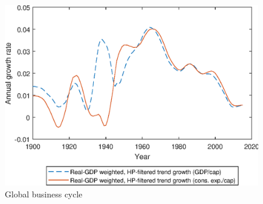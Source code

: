 {{{{\begin{figure}[H]
	\centering
  \includegraphics[width=\textwidth]{Matlab Graphics/Figure_9}
	\caption{Global business cycle}
	\label{fig:global_business_cycle}
\end{figure}

}}}}

